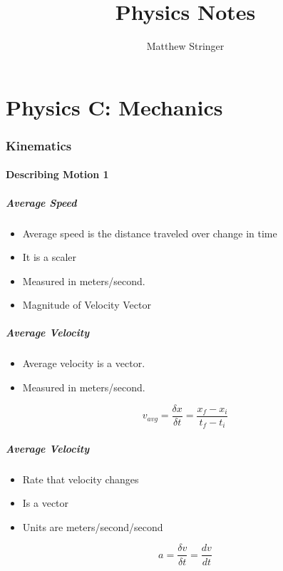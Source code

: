 \documentclass[12pt]{article}
\title{Physics Notes} %
\date{}
\author{Matthew Stringer} %
\theoremstyle{break}
\numberwithin{theorem}{subsection}
\numberwithin{lemma}{subsection}
\numberwithin{corollary}{subsection}
\numberwithin{equation}{subsection}
\begin{document}
\maketitle
\newpage
\tableofcontents


\newpage
\part{Physics C: Mechanics}

\section{Kinematics}
\subsection{Describing Motion 1}

\subsubsection{Average Speed}
\begin{itemize}
	\item Average speed is the distance traveled over change in time
	\item It is a scaler
	\item Measured in meters/second.
	\item Magnitude of Velocity Vector
\end{itemize}

\subsubsection{Average Velocity}
\begin{itemize}
	\item Average velocity is a vector.
	\item Measured in meters/second.
\end{itemize}
\begin{equation*}
v_{avg} = \frac{\delta x}{\delta t} = \frac{x_f - x_i}{t_f - t_i}
\end{equation*}

\subsubsection{Average Velocity}
\begin{itemize}
	\item Rate that velocity changes
	\item Is a vector
	\item Units are meters/second/second
\end{itemize}
\begin{equation*}
a = \frac{\delta v}{\delta t} = \frac{dv}{dt}
\end{equation*}
\end{document}
